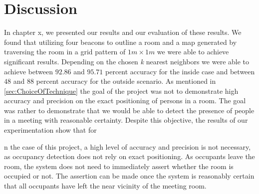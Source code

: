 \chapter{Discussion}\label{chap:discussion}
In chapter x, we presented our results and our evaluation of these results. 
We found that utilizing four beacons to outline a room and a map generated by traversing the room in a grid pattern of $1m \times 1m$ we were able to achieve significant results. 
Depending on the chosen \textit{k} nearest neighbors we were able to achieve between $92.86$ and $95.71$ percent accuracy for the inside case and between $48$ and $88$ percent accuracy for the outside scenario. 
As mentioned in \ref{sec:ChoiceOfTechnique} the goal of the project was not to demonstrate high accuracy and precision on the exact positioning of persons in a room. 
The goal was rather to demonstrate that we would be able to detect the presence of people in a meeting with reasonable certainty.
Despite this objective, the results of our experimentation show that for


n the case of
this project, a high level of accuracy and precision is not necessary, as occupancy
detection does not rely on exact positioning. As occupants leave the room, the
system does not need to immediately assert whether the room is occupied or not.
The assertion can be made once the system is reasonably certain that all occupants
have left the near vicinity of the meeting room.





